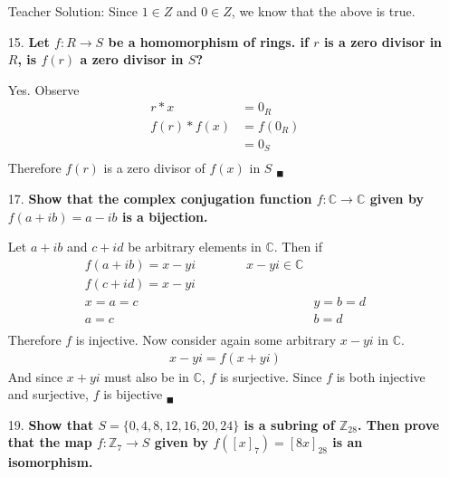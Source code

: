 \documentclass{article}
\begin{document}
\begin{enumerate}
			Teacher Solution:
				Since $1 \in Z$ and $0 \in Z$, we know that the above is true.

		\item [15.] \textbf{Let $f:R \rightarrow S$ be a homomorphism of rings. if $r$ is a zero 
							divisor in $R$, is $f(r)$ a zero divisor in $S$?}			

			Yes. Observe
			\begin{align*}
				r * x & = 0_R \\
				f(r) * f(x) & = f(0_R) \\
							& = 0_S \\ 
			\end{align*}
			Therefore $f(r)$ is a zero divisor of $f(x)$ in $S$ $_{\blacksquare}$

		\item [17.] \textbf{Show that the complex conjugation function $f:\mathbb{C} \rightarrow 
							\mathbb{C}$ given by $f(a + ib) = a - ib$ is a bijection.}

			Let $a + ib$ and $c + id$ be arbitrary elements in $\mathbb{C}$. Then if 
			\begin{align*}
				f(a + ib) = x - yi \qquad \qquad x - yi \in \mathbb{C} \\
				f(c + id) = x - yi \\
				x = a = c & y = b = d \\
				a = c & b = d \\
			\end{align*} 
			Therefore $f$ is injective. Now consider again some arbitrary $x - yi$ in $\mathbb{C}$.
			\begin{align*}
				x - yi = f(x + yi)
			\end{align*}
			And since $x + yi$ must also be in $\mathbb{C}$, $f$ is surjective. Since $f$ is both
			injective and surjective, $f$ is bijective $_{\blacksquare}$

		\item [19.] \textbf{Show that $S = \lbrace 0, 4, 8, 12, 16, 20, 24 \rbrace$ is a subring of
							$\mathbb{Z}_{28}$. Then prove that the map $f:\mathbb{Z}_7 \rightarrow
							S$ given by $f([x]_7) = [8x]_{28}$ is an isomorphism.}


\end{enumerate}
\end{document}
